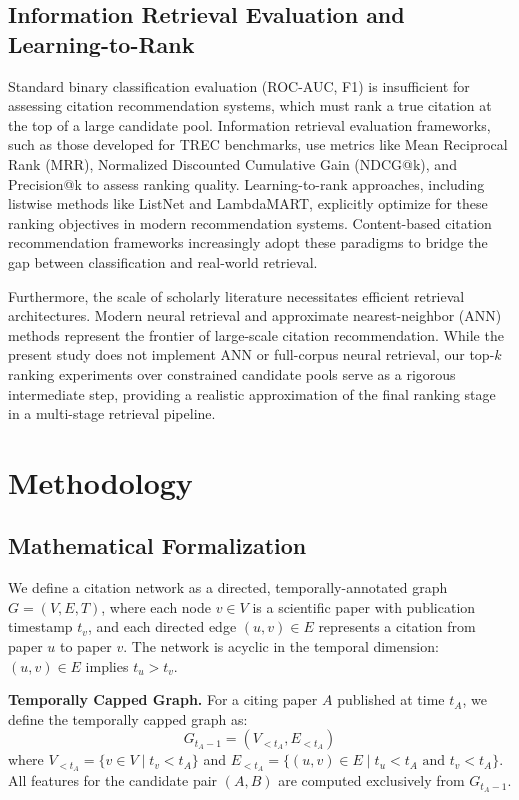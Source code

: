 \documentclass[11pt,a4paper]{article}
\begin{document}
\subsection{Information Retrieval Evaluation and Learning-to-Rank}
Standard binary classification evaluation (ROC-AUC, F1) is insufficient for assessing citation recommendation systems, which must rank a true citation at the top of a large candidate pool. Information retrieval evaluation frameworks, such as those developed for TREC benchmarks, use metrics like Mean Reciprocal Rank (MRR), Normalized Discounted Cumulative Gain (NDCG@k), and Precision@k to assess ranking quality. Learning-to-rank approaches, including listwise methods like ListNet and LambdaMART, explicitly optimize for these ranking objectives in modern recommendation systems. Content-based citation recommendation frameworks \citep{bhagavatula2018content} increasingly adopt these paradigms to bridge the gap between classification and real-world retrieval.

Furthermore, the scale of scholarly literature necessitates efficient retrieval architectures. Modern neural retrieval and approximate nearest-neighbor (ANN) methods represent the frontier of large-scale citation recommendation. While the present study does not implement ANN or full-corpus neural retrieval, our top-$k$ ranking experiments over constrained candidate pools serve as a rigorous intermediate step, providing a realistic approximation of the final ranking stage in a multi-stage retrieval pipeline.

\section{Methodology}
\label{sec:method}

\subsection{Mathematical Formalization}
We define a citation network as a directed, temporally-annotated graph $G = (V, E, T)$, where each node $v \in V$ is a scientific paper with publication timestamp $t_v$, and each directed edge $(u, v) \in E$ represents a citation from paper $u$ to paper $v$. The network is acyclic in the temporal dimension: $(u, v) \in E$ implies $t_u > t_v$.

\textbf{Temporally Capped Graph.} For a citing paper $A$ published at time $t_A$, we define the temporally capped graph as:
\[
G_{t_A-1} = (V_{<t_A}, E_{<t_A})
\]
where $V_{<t_A} = \{v \in V \mid t_v < t_A\}$ and $E_{<t_A} = \{(u,v) \in E \mid t_u < t_A \text{ and } t_v < t_A\}$. All features for the candidate pair $(A, B)$ are computed exclusively from $G_{t_A-1}$.
\end{document}
